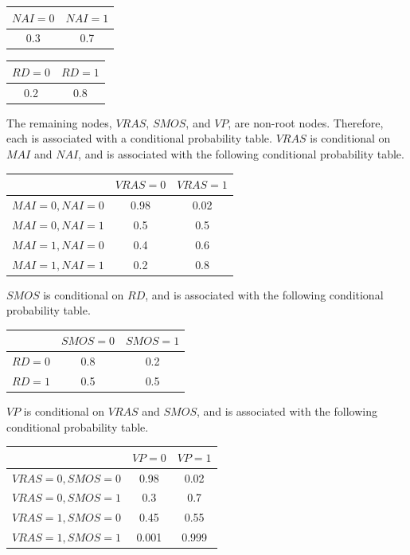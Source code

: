 \documentclass[solution, letterpaper]{cs121}
\begin{document}
\begin{empfile}
\begin{center}
\begin{tabular}{ c |c }
   $NAI = 0$ & $NAI = 1$ \\
   \hline
  0.3 & 0.7 \\
\end{tabular}
\end{center}

\begin{center}
\begin{tabular}{ c |c }
   $RD = 0$ & $RD = 1$ \\
   \hline
  0.2 & 0.8 \\
\end{tabular}
\end{center}

The remaining nodes, $VRAS$, $SMOS$, and $VP$, are non-root nodes. Therefore, each is associated with a conditional probability table. $VRAS$ is conditional on $MAI$ and $NAI$, and is associated with the following conditional probability table.
\begin{center}
\begin{tabular}{ c |c c }
   & $VRAS = 0$ & $VRAS = 1$ \\
   \hline
  $MAI = 0, NAI = 0 $ & 0.98 & 0.02 \\
  $MAI = 0, NAI = 1 $ & 0.5 & 0.5 \\
  $MAI = 1, NAI = 0 $ & 0.4 & 0.6 \\
  $MAI = 1, NAI = 1 $ & 0.2 & 0.8 \\
\end{tabular}
\end{center}

$SMOS$ is conditional on $RD$, and is associated with the following conditional probability table.
\begin{center}
\begin{tabular}{ c |c c }
   & $SMOS = 0$ & $SMOS = 1$ \\
   \hline
  $RD = 0$ & 0.8 & 0.2 \\
  $RD = 1$ & 0.5 & 0.5 \\
\end{tabular}
\end{center}

$VP$ is conditional on $VRAS$ and $SMOS$, and is associated with the following conditional probability table.
\begin{center}
\begin{tabular}{ c |c c }
   & $VP = 0$ & $VP = 1$ \\
   \hline
  $VRAS = 0, SMOS = 0 $ & 0.98 & 0.02 \\
  $VRAS = 0, SMOS = 1 $ & 0.3 & 0.7 \\
  $VRAS = 1, SMOS = 0 $ & 0.45 & 0.55 \\
  $VRAS = 1, SMOS = 1 $ & 0.001 & 0.999 \\
\end{tabular}
\end{center}


\end{empfile}
\end{document}
